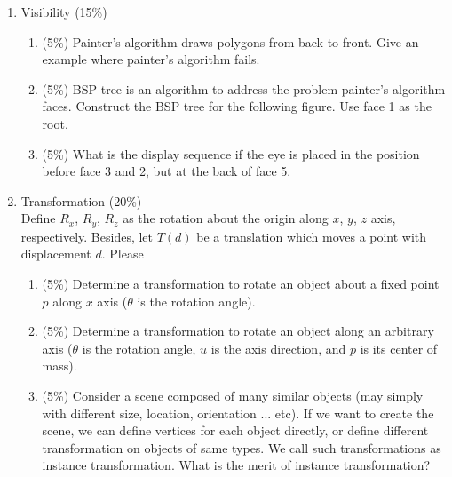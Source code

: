 \documentclass[fleqn]{article}
\begin{document}
\ExamNameLine

\begin{enumerate}
   \item Visibility (15\%) 
      \begin{enumerate}
         \item (5\%) Painter’s algorithm draws polygons from back to front. Give an example where painter’s algorithm fails. 
         \item (5\%) BSP tree is an algorithm to address the problem painter’s algorithm faces. Construct the BSP tree for the following figure. Use face 1 as the root.
         \item (5\%) What is the display sequence if the eye is placed in the position before face 3 and 2, but at the back of face 5.
      \end{enumerate}
      \begin{minipage}[c]{\linewidth}
         \centering
         \medskip
      \end{minipage}
   \newpage
   \item Transformation (20\%) \\
      Define $R_x$, $R_y$, $R_z$ as the rotation about the origin along $x$, $y$, $z$ axis, respectively. Besides, let $T(d)$ be a translation which moves a point with displacement $d$. Please 
      \begin{enumerate}
         \item (5\%) Determine a transformation to rotate an object about a fixed point $p$ along $x$ axis ($\theta$ is the rotation angle). 
         \item (5\%) Determine a transformation to rotate an object along an arbitrary axis ($\theta$ is the rotation angle, $u$ is the axis direction, and $p$ is its center of mass). 
         \item (5\%) Consider a scene composed of many similar objects (may simply with different size, location, orientation ... etc). If we want to create the scene, we can define vertices for each object directly, or define different transformation on objects of same types. We call such transformations as instance transformation. What is the merit of instance transformation?

\end{enumerate}
\end{enumerate}
\end{document}
